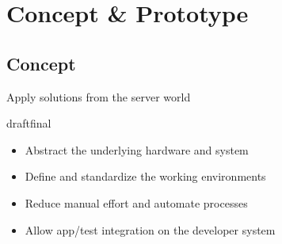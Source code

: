 \documentclass{beamer}
\def\final{final}
\def\status{draft}
\begin{document}
\section{Concept \& Prototype}
\subsection{Concept}
\begin{frame}{}
  \begin{center}
    \Large Apply solutions from the server world
  \end{center}
  \vspace{.8cm}

  \ifx\status\final{}
    \pause{}
  \fi

  \begin{itemize}
    \setlength\itemsep{1.2em}
    \large
    \item Abstract the underlying hardware and system
    \item Define and standardize the working environments
    \item Reduce manual effort and automate processes
    \item Allow app/test integration on the developer system
  \end{itemize}
\end{frame}
\end{document}
